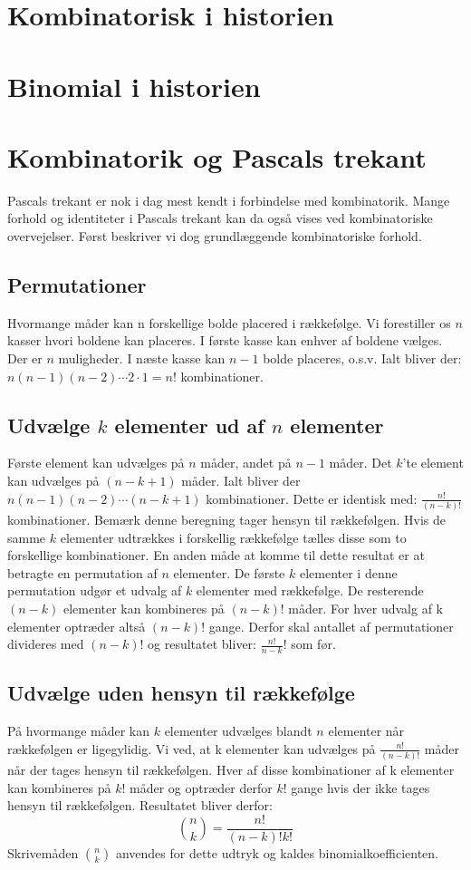 \section{Kombinatorisk i historien}
\section{Binomial i historien}
\section{Kombinatorik og Pascals trekant}
Pascals trekant er nok i dag mest kendt i forbindelse med kombinatorik. Mange forhold og identiteter i Pascals trekant kan da også vises ved kombinatoriske overvejelser. Først beskriver vi dog grundlæggende kombinatoriske forhold. 
\subsection{Permutationer}
Hvormange måder kan n forskellige bolde placered i rækkefølge. Vi forestiller os \(n\) kasser hvori boldene kan placeres. I første kasse kan enhver af boldene vælges. Der er \(n\) muligheder. I næste kasse kan \(n-1\) bolde placeres, o.s.v. Ialt bliver der: \(n(n-1)(n-2) \dotsm 2 \cdot 1=n!\) kombinationer.
\subsection{Udvælge \(k\) elementer ud af \(n\) elementer} 
Første element kan udvælges på \(n\) måder, andet på \(n-1\) måder. Det \(k\)'te element kan udvælges på \((n-k+1)\) måder. Ialt bliver der \(n(n-1)(n-2) \dotsm (n-k+1)\) kombinationer. Dette er identisk med: \(\frac{n!}{(n-k)!}\) kombinationer. Bemærk denne beregning tager hensyn til rækkefølgen. Hvis de samme \(k\) elementer udtrækkes i forskellig rækkefølge tælles disse som to forskellige kombinationer. En anden måde at komme til dette resultat er at betragte en permutation  af \(n\) elementer. De første \(k\) elementer i denne permutation udgør et udvalg af \(k\) elementer med rækkefølge. De resterende \((n-k)\) elementer kan kombineres på \((n-k)!\) måder. For hver udvalg af k elementer optræder altså \((n-k)!\) gange. Derfor skal antallet af permutationer divideres med \((n-k)!\) og resultatet bliver: \(\frac{n!}{n-k}!\) som før.
\subsection{Udvælge uden hensyn til rækkefølge}
På hvormange måder kan \(k\) elementer udvælges blandt \(n\) elementer når rækkefølgen er ligegylidig. Vi ved, at k elementer kan udvælges på \(\frac{n!}{(n-k)!}\) måder når der tages hensyn til rækkefølgen. Hver af disse kombinationer af k elementer kan kombineres på \(k!\) måder og optræder derfor \(k!\) gange hvis der ikke tages hensyn til rækkefølgen. Resultatet bliver derfor:
\[\binom{n}{k}=\frac{n!}{(n-k)!k!}\]
Skrivemåden \(\binom{n}{k}\) anvendes for dette udtryk og kaldes binomialkoefficienten.
